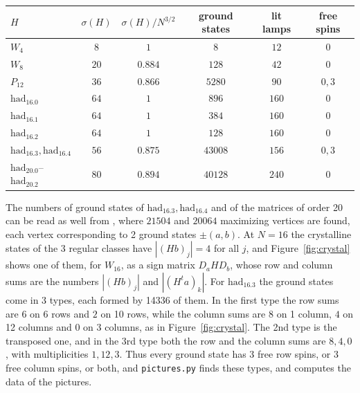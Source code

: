 \documentclass[11pt,a4paper]{article}
\theoremstyle{remark}
\begin{document}
\begin{center}
\begin{tabular}{|l|c|c|c|c|c|}
\hline
$H$ & $\sigma(H)$ & $\sigma(H)/N^{3/2}$ & ground states & lit lamps & free spins\\
\hline
$W_4$ & $8$ & $1$ & $8$ & $12$ & $0$\\
$W_8$ & $20$ & $0.884$ & $128$ & $42$ & $0$\\
$P_{12}$ & $36$ & $0.866$ & $5280$ & $90$ & $0,3$\\
$\mathrm{had}_{16.0}$ & $64$ & $1$ & $896$ & $160$ & $0$\\
$\mathrm{had}_{16.1}$ & $64$ & $1$ & $384$ & $160$ & $0$\\
$\mathrm{had}_{16.2}$ & $64$ & $1$ & $128$ & $160$ & $0$\\
$\mathrm{had}_{16.3},\mathrm{had}_{16.4}$ & $56$ & $0.875$ & $43008$ & $156$ & $0,3$\\
$\mathrm{had}_{20.0}$--$\mathrm{had}_{20.2}$ & $80$ & $0.894$ & $40128$ & $240$ & $0$\\
\hline
\end{tabular}
\end{center}

\medskip

\noindent The numbers of ground states of $\mathrm{had}_{16.3},\mathrm{had}_{16.4}$ and of the matrices of order 20 can be read as well from \cite{gbt}, where $21504$ and $20064$ maximizing vertices are found, each vertex corresponding to 2 ground states $\pm(a,b)$. At $N=16$ the crystalline states of the 3 regular classes have $|(Hb)_j|=4$ for all $j$, and Figure~\ref{fig:crystal} shows one of them, for $W_{16}$, as a sign matrix $D_aHD_b$, whose row and column sums are the numbers $|(Hb)_j|$ and $|(H^ta)_k|$. For $\mathrm{had}_{16.3}$ the ground states come in 3 types, each formed by 14336 of them. In the first type the row sums are $6$ on 6 rows and $2$ on 10 rows, while the column sums are $8$ on 1 column, $4$ on 12 columns and $0$ on 3 columns, as in Figure~\ref{fig:crystal}. The 2nd type is the transposed one, and in the 3rd type both the row and the column sums are $8,4,0$, with multiplicities $1,12,3$. Thus every ground state has 3 free row spins, or 3 free column spins, or both, and \texttt{pictures.py} finds these types, and computes the data of the pictures.
\end{document}

